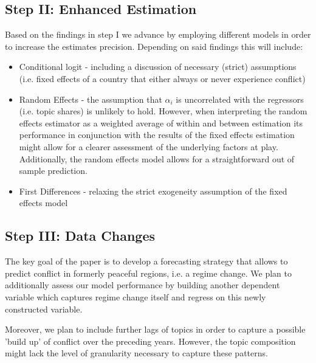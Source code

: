 \subsection{Step II: Enhanced Estimation}
Based on the findings in step I we advance by employing different models in order to increase the estimates precision. Depending on said findings this will include: 
\begin{itemize}
    \item Conditional logit - including a discussion of necessary (strict) assumptions (i.e. fixed effects of a country that either always or never experience conflict)
    \item Random Effects - the assumption that $\alpha_i$ is uncorrelated with the regressors (i.e. topic shares) is unlikely to hold. However, when interpreting the random effects estimator as a weighted average of within and between estimation its performance in conjunction with the results of the fixed effects estimation might allow for a clearer assessment of the underlying factors at play. Additionally, the random effects model allows for a straightforward out of sample prediction.
    \item First Differences - relaxing the strict exogeneity assumption of the fixed effects model
\end{itemize}



\subsection{Step III: Data Changes}
The key goal of the paper is to develop a forecasting strategy that allows to predict conflict in formerly peaceful regions, i.e. a regime change. We plan to additionally assess our model performance by building another dependent variable which captures regime change itself and regress on this newly constructed variable.


Moreover, we plan to include further lags of topics in order to capture a possible 'build up' of conflict over the preceding years. However, the topic composition might lack the level of granularity necessary to capture these patterns. 



